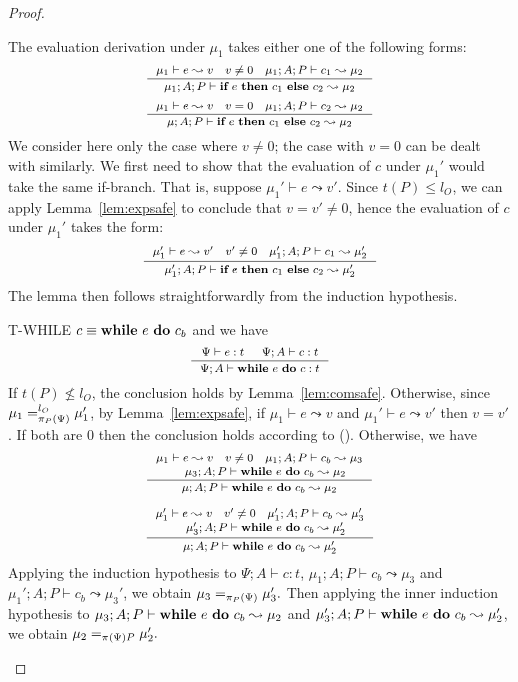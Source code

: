 {{{\begin{proof}
\begin{ProofEnumDesc}
The evaluation derivation under $\mu_1$
takes either one of the following forms:
$$\myeqsize
\inference{\mu_1 \vdash e \leadsto v\quad v\neq 0\quad \mu_1; A; P \vdash c_1 \leadsto \mu_2}
{\mu_1; A; P \vdash \lcIF{e}{c_1}{c_2} \leadsto \mu_2}
$$
$$\myeqsize
\inference{\mu_1 \vdash e \leadsto v\quad v = 0\quad \mu_1;A; P \vdash c_2 \leadsto \mu_2}
{\mu;A; P \vdash \lcIF{e}{c_1}{c_2} \leadsto \mu_2}
$$
We consider here only the case where $v\not = 0$; the case with $v=0$
can be dealt with similarly.
We first need to show that the evaluation of $c$ under $\mu_1'$
would take the same if-branch. That is, suppose $\mu_1' \vdash e \leadsto v'$.
Since $t(P) \leq l_O$, we can apply Lemma~\ref{lem:expsafe} to conclude
that $v=v' \not = 0$, hence the evaluation of $c$ under $\mu_1'$ takes the
form:
$$\myeqsize
\inference{\mu_1' \vdash e \leadsto v'\quad v'\neq 0\quad \mu_1'; A; P \vdash c_1 \leadsto \mu_2'}
{\mu_1'; A; P \vdash \lcIF{e}{c_1}{c_2} \leadsto \mu_2'}
$$
The lemma then follows straightforwardly from the induction hypothesis.

\item[T-WHILE] $c\equiv\textbf{while}~{e}~\textbf{do}~{c_b}$ and we have
$$\myeqsize
\inference
{\Psi \vdash e : t & \Psi ; A\vdash c : t  }
{\Psi; A \vdash \lcWHILE{e}{c} : t }
$$
If $t(P) \nleq l_{O}$, the conclusion holds by
Lemma~\ref{lem:comsafe}. Otherwise, since
$\mu_1=_{\pi_{{P}}({\Psi})}^{l_{O}}\mu_1'$, by
Lemma~\ref{lem:expsafe}, if
$\mu_1 \vdash e \leadsto v$ and $\mu_1' \vdash e \leadsto v'$
then $v=v'$.
If both are $0$ then the conclusion holds according to
(). Otherwise, we have
$$\myeqsize
\inference{
\mu_1 \vdash e \leadsto v\quad v\neq 0\quad
\mu_1;A; P \vdash c_b \leadsto \mu_3\\
\quad \mu_3 ; A ; P \vdash \lcWHILE{e}{c_b} \leadsto \mu_2
}
{\mu;A; P \vdash \lcWHILE{e}{c_b} \leadsto \mu_2}
$$

$$\myeqsize
\inference{
\mu_1' \vdash e \leadsto v\quad v'\neq 0\quad
\mu_1';A; P \vdash c_b \leadsto \mu_3'\\
\quad \mu_3' ; A ; P \vdash \lcWHILE{e}{c_b} \leadsto \mu_2'
}
{\mu;A; P \vdash \lcWHILE{e}{c_b} \leadsto \mu_2'}
$$
Applying the induction hypothesis to $\Psi ; A\vdash c : t$,
$\mu_1;A; P \vdash c_b \leadsto \mu_3$ and
$\mu_1';A; P \vdash c_b \leadsto \mu_3'$, we obtain
$\mu_3 =_{\pi_{{P}}({\Psi})} \mu_3'.$ Then applying the inner
induction hypothesis to $\mu_3 ; A ; P \vdash \textbf{while}~{e}~\textbf{do}~{c_b} \leadsto \mu_2$
and $\mu_3' ; A ; P \vdash \textbf{while}~{e}~\textbf{do}~{c_b} \leadsto \mu_2'$,
we obtain $\mu_2 =_{\app{\Psi} P} \mu_2'.$


\end{ProofEnumDesc}
\end{proof}}}}
